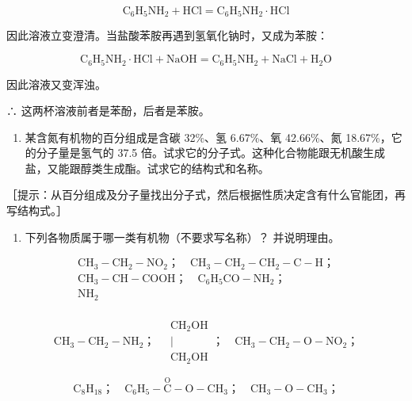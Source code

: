 \[
\mathrm{C} _ {6} \mathrm{H} _ {5} \mathrm{NH} _ {2} + \mathrm{HCl} = \mathrm{C} _ {6} \mathrm{H} _ {5} \mathrm{NH} _ {2} \cdot \mathrm{HCl}
\]

因此溶液立变澄清。当盐酸苯胺再遇到氢氧化钠时，又成为苯胺：

\[
\mathrm{C} _ {6} \mathrm{H} _ {5} \mathrm{NH} _ {2} \cdot \mathrm{HCl} + \mathrm{NaOH} = \mathrm{C} _ {6} \mathrm{H} _ {5} \mathrm{NH} _ {2} + \mathrm{NaCl} + \mathrm{H} _ {2} \mathrm{O}
\]

因此溶液又变浑浊。

∴ 这两杯溶液前者是苯酚，后者是苯胺。

\begin{enumerate}[start=8]
\item
  某含氮有机物的百分组成是含碳 32\%、氢 6.67\%、氧 42.66\%、氮
  18.67\%，它的分子量是氢气的 37.5
  倍。试求它的分子式。这种化合物能跟无机酸生成盐，又能跟醇类生成酯。试求它的结构式和名称。
\end{enumerate}

［提示：从百分组成及分子量找出分子式，然后根据性质决定含有什么官能团，再写结构式。］

\begin{enumerate}[start=9]
\item
  下列各物质属于哪一类有机物（不要求写名称）？ 并说明理由。
\end{enumerate}

\[
\begin{array}{l} \mathrm{CH} _ {3} - \mathrm{CH} _ {2} - \mathrm{NO} _ {2}\text{；} \quad \mathrm{CH} _ {3} - \mathrm{CH} _ {2} - \mathrm{CH} _ {2} - \mathrm{C} - \mathrm{H}\text{；} \\ \mathrm{CH} _ {3} - \mathrm{CH} - \mathrm{COOH}\text{；} \quad \mathrm{C} _ {6} \mathrm{H} _ {5} \mathrm{CO} - \mathrm{NH} _ {2}\text{；} \\ \mathrm{NH} _ {2} \\ \end{array}
\]

\[
\mathrm{CH} _ {3} - \mathrm{CH} _ {2} - \mathrm{NH} _ {2}\text{；} \quad \begin{array}{c} \mathrm{CH} _ {2} \mathrm{OH} \\ \mid \\ \mathrm{CH} _ {2} \mathrm{OH} \end{array} \text{；} \quad \mathrm{CH} _ {3} - \mathrm{CH} _ {2} - \mathrm{O} - \mathrm{NO} _ {2}\text{；}
\]

\[
\mathrm{C} _ {8} \mathrm{H} _ {18}\text{；} \quad \mathrm{C} _ {6} \mathrm{H} _ {5} - \stackrel {\mathrm{O}} {\mathrm{C}} - \mathrm{O} - \mathrm{CH} _ {3}\text{；} \quad \mathrm{CH} _ {3} - \mathrm{O} - \mathrm{CH} _ {3}\text{；}
\]

